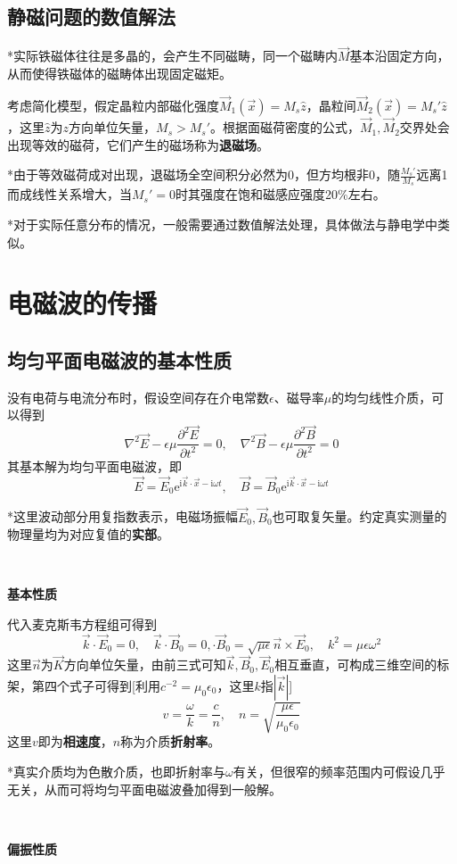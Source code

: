 \documentclass[a4paper,UTF8,fontset=windows]{ctexart}
\newcommand*{\er}{\mathrm{e}}
\newcommand*{\ir}{\mathrm{i}}
\newcommand*{\vb}{\vec{B}}
\newcommand*{\ve}{\vec{E}}
\newcommand*{\vk}{\vec{K}}
\newcommand*{\vm}{\vec{M}}
\newcommand*{\vks}{\vec{k}}
\newcommand*{\vns}{\vec{n}}
\newcommand*{\vx}{\vec{x}}
\newcommand*{\ppt}[2][t^2]{\frac{\partial^2 #2}{\partial #1}}
\begin{document}
\subsection{静磁问题的数值解法}
*实际铁磁体往往是多晶的，会产生不同磁畴，同一个磁畴内$\vm$基本沿固定方向，从而使得铁磁体的磁畴体出现固定磁矩。

考虑简化模型，假定晶粒内部磁化强度$\vm_1(\vx)=M_s\hat{z}$，晶粒间$\vm_2(\vx)=M_s'\hat{z}$，这里$\hat{z}$为$z$方向单位矢量，$M_s> M_s'$。根据面磁荷密度的公式，$\vm_1,\vm_2$交界处会出现等效的磁荷，它们产生的磁场称为\textbf{退磁场}。

*由于等效磁荷成对出现，退磁场全空间积分必然为0，但方均根非0，随$\frac{M_s'}{M_s}$远离1而成线性关系增大，当$M_s'=0$时其强度在饱和磁感应强度20\%左右。

*对于实际任意分布的情况，一般需要通过数值解法处理，具体做法与静电学中类似。

\section{电磁波的传播}
\subsection{均匀平面电磁波的基本性质}
没有电荷与电流分布时，假设空间存在介电常数$\epsilon$、磁导率$\mu$的均匀线性介质，可以得到
$$\nabla^2\ve-\epsilon\mu\ppt{\ve}=0,\quad\nabla^2\vb-\epsilon\mu\ppt{\vb}=0$$
其基本解为均匀平面电磁波，即
$$\ve=\ve_0\er^{\ir\vks\cdot\vx-\ir\omega t},\quad\vb=\vb_0\er^{\ir\vks\cdot\vx-\ir\omega t}$$

*这里波动部分用复指数表示，电磁场振幅$\ve_0,\vb_0$也可取复矢量。约定真实测量的物理量均为对应复值的\textbf{实部}。

\

\textbf{基本性质}

代入麦克斯韦方程组可得到
$$\vks\cdot\ve_0=0,\quad\vks\cdot\vb_0=0,\cdot\vb_0=\sqrt{\mu\epsilon}\vns\times\ve_0,\quad k^2=\mu\epsilon\omega^2$$
这里$\vns$为$\vk$方向单位矢量，由前三式可知$\vks,\vb_0,\ve_0$相互垂直，可构成三维空间的标架，第四个式子可得到[利用$c^{-2}=\mu_0\epsilon_0$，这里$k$指$|\vks|$]
$$v=\frac{\omega}{k}=\frac{c}{n},\quad n=\sqrt{\frac{\mu\epsilon}{\mu_0\epsilon_0}}$$
这里$v$即为\textbf{相速度}，$n$称为介质\textbf{折射率}。

*真实介质均为色散介质，也即折射率与$\omega$有关，但很窄的频率范围内可假设几乎无关，从而可将均匀平面电磁波叠加得到一般解。

\

\textbf{偏振性质}
\end{document}
